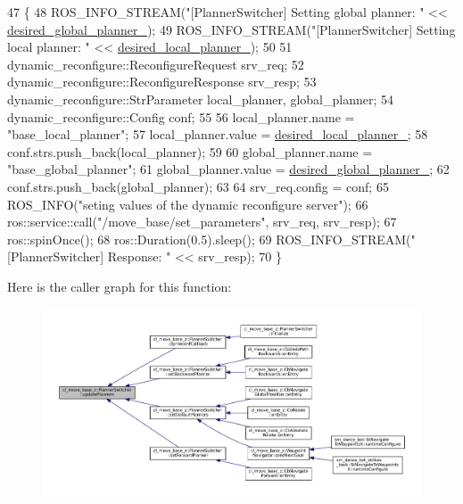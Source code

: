 \begin{DoxyCode}
47 \{
48   ROS\_INFO\_STREAM(\textcolor{stringliteral}{"[PlannerSwitcher] Setting global planner: "} << 
      \hyperlink{classcl__move__base__z_1_1PlannerSwitcher_aef047d3778b2993c1df146bbad43e03d}{desired\_global\_planner\_});
49   ROS\_INFO\_STREAM(\textcolor{stringliteral}{"[PlannerSwitcher] Setting local planner: "} << 
      \hyperlink{classcl__move__base__z_1_1PlannerSwitcher_a6cbf65f11bb69125f913caaabdf7b4cf}{desired\_local\_planner\_});
50 
51   dynamic\_reconfigure::ReconfigureRequest srv\_req;
52   dynamic\_reconfigure::ReconfigureResponse srv\_resp;
53   dynamic\_reconfigure::StrParameter local\_planner, global\_planner;
54   dynamic\_reconfigure::Config conf;
55 
56   local\_planner.name = \textcolor{stringliteral}{"base\_local\_planner"};
57   local\_planner.value = \hyperlink{classcl__move__base__z_1_1PlannerSwitcher_a6cbf65f11bb69125f913caaabdf7b4cf}{desired\_local\_planner\_};
58   conf.strs.push\_back(local\_planner);
59 
60   global\_planner.name = \textcolor{stringliteral}{"base\_global\_planner"};
61   global\_planner.value = \hyperlink{classcl__move__base__z_1_1PlannerSwitcher_aef047d3778b2993c1df146bbad43e03d}{desired\_global\_planner\_};
62   conf.strs.push\_back(global\_planner);
63 
64   srv\_req.config = conf;
65   ROS\_INFO(\textcolor{stringliteral}{"seting values of the dynamic reconfigure server"});
66   ros::service::call(\textcolor{stringliteral}{"/move\_base/set\_parameters"}, srv\_req, srv\_resp);
67   ros::spinOnce();
68   ros::Duration(0.5).sleep();
69   ROS\_INFO\_STREAM(\textcolor{stringliteral}{"[PlannerSwitcher] Response: "} << srv\_resp);
70 \}
\end{DoxyCode}
Here is the caller graph for this function\+:
\nopagebreak
\begin{figure}[H]
\begin{center}
\leavevmode
\includegraphics[width=350pt]{classcl__move__base__z_1_1PlannerSwitcher_a146641f63aea3185daab4c5cbb789550_icgraph}
\end{center}
\end{figure}


